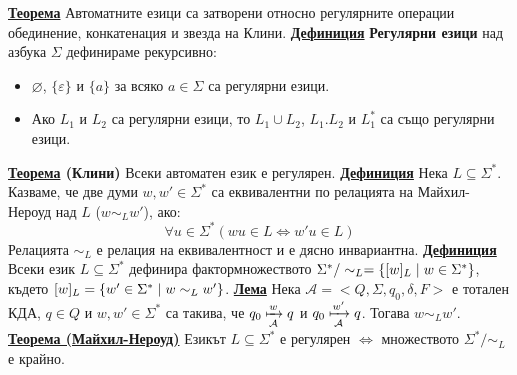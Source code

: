 \documentclass{article}
\begin{document}
\textbf{\underline{Теорема}} \newline
Автоматните езици са затворени относно регулярните операции обединение, конкатенация и звезда на Клини. \newline\newline
\textbf{\underline{Дефиниция}}
\textbf{Регулярни езици} над азбука $\Sigma$ дефинираме рекурсивно:
\begin{itemize}
    \item $\varnothing$, $\{\varepsilon\}$ и $\{a\}$ за всяко $a \in \Sigma$ са регулярни езици.
    \item Ако $L_1$ и $L_2$ са регулярни езици, то $L_1 \cup L_2$, $L_1 . L_2$ и $L_1^*$ са също регулярни езици.
\end{itemize}
\textbf{\underline{Теорема} (Клини)} \newline
Всеки автоматен език е регулярен. \newline\newline
\textbf{\underline{Дефиниция}}
Нека $L \subseteq \Sigma^*$. Казваме, че две думи $w, w' \in \Sigma^*$ са еквивалентни по релацията на Майхил-Нероуд над $L$ ($w \sim_L w'$), ако:
$$\forall u \in \Sigma^* (wu \in L \iff w'u \in L)$$
Релацията $\sim_L$ е релация на еквивалентност и е дясно инвариантна. \newline\newline
\textbf{\underline{Дефиниция}}
Всеки език $L \subseteq \Sigma^*$ дефинира фактормножеството $\Sigma^*/\sim_L = \{[w]_L \hspace{0.1cm} | \hspace{0.1cm} w \in \Sigma^*\}$, където
$[w]_L = \{w' \in \Sigma^* \hspace{0.1cm} | \hspace{0.1cm} w \sim_L w'\}$. \newline\newline
\textbf{\underline{Лема}} \newline
Нека $\mathcal{A} = <Q, \Sigma, q_0, \delta, F>$ е тотален КДА, $q \in Q$ и $w, w' \in \Sigma^*$
са такива, че $q_0 \xmapsto[\mathcal{A}]{w} q$ и $q_0 \xmapsto[\mathcal{A}]{w'} q$. Тогава $w \sim_L w'$. \newline\newline
\textbf{\underline{Теорема (Майхил-Нероуд)}} \newline
Езикът $L \subseteq \Sigma^*$ е регулярен $\iff$ множеството $\Sigma^*/\sim_L$ е крайно.
\end{document}

